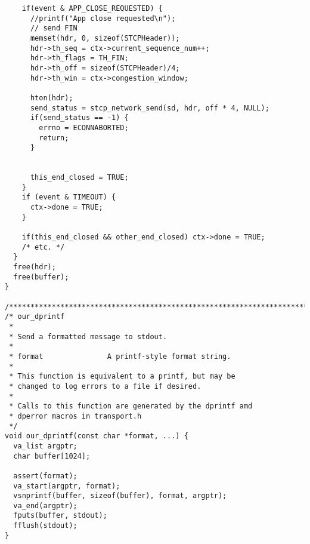 \documentclass[11pt]{article}
\begin{document}
\begin{verbatim}
    if(event & APP_CLOSE_REQUESTED) {
      //printf("App close requested\n");
      // send FIN
      memset(hdr, 0, sizeof(STCPHeader));
      hdr->th_seq = ctx->current_sequence_num++;
      hdr->th_flags = TH_FIN;
      hdr->th_off = sizeof(STCPHeader)/4;
      hdr->th_win = ctx->congestion_window;

      hton(hdr);
      send_status = stcp_network_send(sd, hdr, off * 4, NULL);
      if(send_status == -1) {
        errno = ECONNABORTED;
        return;
      }


      this_end_closed = TRUE;
    }
    if (event & TIMEOUT) {
      ctx->done = TRUE;
    }

    if(this_end_closed && other_end_closed) ctx->done = TRUE;
    /* etc. */
  }
  free(hdr);
  free(buffer);
}

/**********************************************************************/
/* our_dprintf
 *
 * Send a formatted message to stdout.
 *
 * format               A printf-style format string.
 *
 * This function is equivalent to a printf, but may be
 * changed to log errors to a file if desired.
 *
 * Calls to this function are generated by the dprintf amd
 * dperror macros in transport.h
 */
void our_dprintf(const char *format, ...) {
  va_list argptr;
  char buffer[1024];

  assert(format);
  va_start(argptr, format);
  vsnprintf(buffer, sizeof(buffer), format, argptr);
  va_end(argptr);
  fputs(buffer, stdout);
  fflush(stdout);
}
\end{verbatim}
\end{document}
